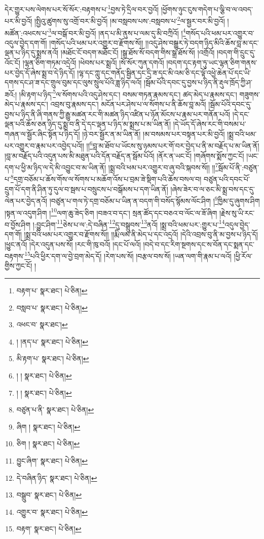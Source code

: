 དེར་གྱུར་པས་ལེགས་པར་སོ་སོར་:བརྟགས་པ་\footnote{བརྟག་པ་  སྣར་ཐང་།  པེ་ཅིན། }བྱས་ཏེ་དྲིལ་བར་བྱའོ། །ཕྱོགས་ཉུང་ངུས་གདེག་པ་ལྕི་བ་ལ་འབད་པར་མི་བྱའོ། །སྤྱིའུ་ཚུགས་སུ་འགྲོ་བར་མི་བྱའོ། །མ་བསླབས་པས་:བསླབས་པ་\footnote{བསླབ་པ་  སྣར་ཐང་།  པེ་ཅིན། }ལ་སྦྱར་བར་མི་བྱའོ། །མཚོན་:འཕངས་པ་\footnote{འཕང་བ་  སྣར་ཐང་། }ལ་བསྒོ་བར་མི་བྱའོ། །ནད་པ་མི་ནུས་པ་ལམ་དུ་མི་བཀྲིའོ། །\footnote{། །ནད་པ་  སྣར་ཐང་།  པེ་ཅིན། }གསོད་པའི་ཕམ་པར་འགྱུར་བ་འདུལ་བྱེད་དག་གོ། །གསོད་པའི་ཕམ་པར་འགྱུར་བ་རྫོགས་སོ།། །།འདུ་ཤེས་བསྒྱུར་ཏེ་བདག་ཉིད་མིའི་ཆོས་བླ་མ་དང་ལྡན་པ་ཉིད་དུ་སྨྲས་ནའོ། །མཐོང་ངོ་བདག་མཐོང་ངོ། །སྒྲ་ཐོས་སོ་བདག་གིས་སྒྲ་ཐོས་སོ། །འགྲོའོ། །བདག་གི་དྲུང་དུ་འོང་ངོ། །ལྷན་ཅིག་གཏམ་འདྲེའོ། །ཕེབས་པར་སྨྲའོ། །སོ་སོར་ཀུན་དགའོ། །བདག་དང་རྟག་ཏུ་ཡང་ལྷན་ཅིག་གནས་པར་བྱེད་དོ་ཞེས་སྨྲ་བ་དེ་ཉིད་དོ། །ལྷ་དང་ཀླུ་དང་གནོད་སྦྱིན་དང་དྲི་ཟ་དང་མི་འམ་ཅི་དང་ལྟོ་འཕྱེ་ཆེན་པོ་དང་ཡི་དགས་དང་ཤ་ཟ་དང་གྲུལ་བུམ་དང་ལུས་སྲུལ་པོའི་ཟླ་ཉིད་ལའོ། །སྦོམ་པོའི་དབང་དུ་བྱས་པ་ཉིད་ནི་རྡུལ་ཁྲོད་ཀྱི་ཤ་ཟའོ:། །མི་རྟག་པ་ཉིད་\footnote{མི་རྟག་པ་  སྣར་ཐང་།  པེ་ཅིན། }ལ་སོགས་པའི་འདུ་ཤེས་དང་། བསམ་གཏན་རྣམས་དང་། ཚད་མེད་པ་རྣམས་དང་། གཟུགས་མེད་པ་རྣམས་དང་། འབྲས་བུ་རྣམས་དང་། མངོན་པར་ཤེས་པ་ལ་སོགས་པ་ནི་ཆོས་བླ་མའོ། །སྦོམ་པོའི་དབང་དུ་བྱས་པ་ཉིད་ནི་ཞི་གནས་ཀྱི་རྒྱུ་མཚན་རང་གི་མཚན་ཉིད་འཛིན་པ་ཉོན་མོངས་པ་རྣམ་པར་གནོན་པའོ། །དེ་དང་ལྡན་པའི་ཆོས་ཅན་ཉིད་དུ་སྨྲ་བ་ནི་དེ་དང་ལྡན་པ་ཉིད་མ་སྨྲས་པ་མ་ཡིན་ནོ། །དེ་ཡོད་དོ་ཞེས་རང་གི་བསམ་པ་གཞན་ལ་སྦྱོར་ཞིང་སྟོན་པ་ཉིད་དོ། །ཉེ་བར་སྦྱོར་ན་མ་ཡིན་ནོ། །མ་བསམས་པར་བསྟན་པར་མི་བྱའོ། །སྨྲ་བའི་ཕམ་པར་འགྱུར་བ་རྣམ་པར་འབྱེད་པའོ།། །།\footnote{། །  སྣར་ཐང་།  པེ་ཅིན། }བླ་མ་ཐོབ་པ་ཡོངས་སུ་ཉམས་པར་གོ་བར་བྱེད་པ་ནི་མ་བརྗོད་པ་མ་ཡིན་ནོ། །བླ་མ་བརྗོད་པའི་འདུན་པས་མི་མཐུན་པའི་དོན་བརྗོད་ན་སྦོམ་པོའོ། །ནོར་ན་ཡང་ངོ། །གཞོགས་སྨོས་ཀྱང་ངོ། །ཡང་དག་པ་ཕྱི་མ་ཉིད་ལ་དེ་མི་འབྱུང་བ་མ་ཡིན་ནོ། །སྨྲ་བའི་ཕམ་པར་འགྱུར་བ་ཞུ་བའི་སྐབས་སོ།། །།\footnote{། །  སྣར་ཐང་།  པེ་ཅིན། }སྦོམ་པོ་ནི་:བཙུན་པ་\footnote{བཙུན་པ་ནི་  སྣར་ཐང་།  པེ་ཅིན། }དགྲ་བཅོམ་པ་ཆོས་གོས་ལ་སོགས་པ་མཆོག་འོས་པ་བྲམ་ཟེ་སྡིག་པའི་ཆོས་བསལ་བ། བཙུན་པའི་དབང་པོ་དྲུག་པོ་དག་ནི་ཤིན་ཏུ་དུལ་བ་སྦས་པ་བསྲུངས་པ་བསྒོམས་པ་དག་ཡིན་ནོ། །ཞེས་ཟེར་བ་ལ་ཅང་མི་སྨྲ་བས་དང་དུ་ལེན་པར་བྱེད་ནའོ། །བཙུན་པ་གལ་ཏེ་དགྲ་བཅོམ་པ་ཡིན་ན་བདག་གི་བསོད་སྙོམས་ལོང་ཤིག །\footnote{ཞིག །  སྣར་ཐང་།  པེ་ཅིན། }ཁྱིམ་དུ་ཞུགས་ཤིག །སྟན་ལ་འདུག་ཤིག །\footnote{ཅིག །  སྣར་ཐང་།  པེ་ཅིན། }ལག་ཆུ་ཟེད་ཅིག །བཟའ་བ་དང་། སྲན་ཚོད་དང་བཅའ་བ་ལོང་ལ་ཟོ་ཞིག །རྗེས་སུ་ཡི་རང་བ་བྱོས་ཤིག །:བྱུང་ཤིག་\footnote{བྱུང་ཞིག་  སྣར་ཐང་།  པེ་ཅིན། }ཅེས་པ་ལ་:དེ་བཞིན་\footnote{དེ་བཞིན་ཉིད་  སྣར་ཐང་།  པེ་ཅིན། }དུ་བསྒྲུབས་\footnote{བསྒྲུབ་  སྣར་ཐང་།  པེ་ཅིན། }ནའོ། །སྨྲ་བའི་ཕམ་པར་:གྱུར་པ་\footnote{འགྱུར་བ་  སྣར་ཐང་།  པེ་ཅིན། }འདུལ་བྱེད་དག་གོ། །སྨྲ་བའི་ཕམ་པར་འགྱུར་བ་རྫོགས་སོ།། །།རྨི་ལམ་ནི་མེད་པ་དང་འདྲའོ། །དེའི་འབྲས་བུ་ནི་མ་བྱས་པ་ཉིད་དོ། །ཕྱུང་ནའོ། །དེར་འདུན་པས་སོ། །རང་གི་ཁུ་བའོ། །དང་པོ་ལའོ། །བདེ་བ་དང་རིག་སྔགས་དང་ས་བོན་དང་སྨན་དང་བརྟགས་\footnote{བརྟག་  སྣར་ཐང་།  པེ་ཅིན། }པའི་ཕྱིར་དག་ལ་བྱེ་བྲག་མེད་དོ། །རེག་པས་སོ། །བརྩལ་བས་སོ། །ཡན་ལག་གི་རྣམ་པ་ལའོ། །ཕྱི་རོལ་གྱིས་ཀྱང་ངོ། །
